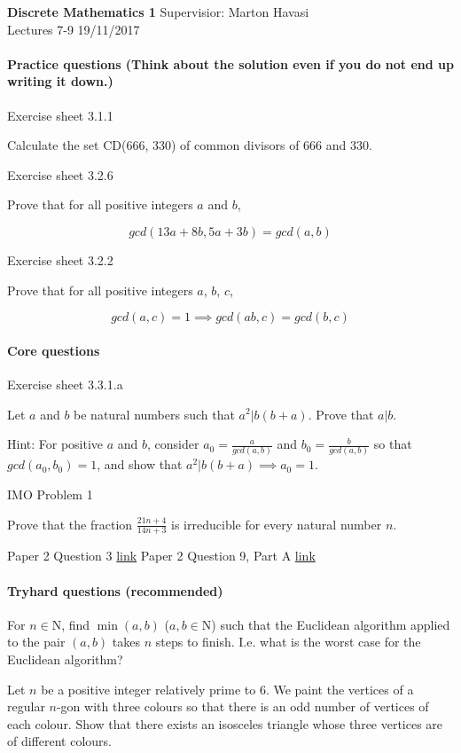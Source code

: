 \documentclass{exam}
\begin{document}
\noindent
\large\textbf{Discrete Mathematics 1} \hfill Supervisior: Marton Havasi \\
\normalsize Lectures 7-9 \hfill 19/11/2017

\paragraph{Practice questions (Think about the solution even if you do not end up writing it down.)}
\begin{questions}
\question Exercise sheet 3.1.1

Calculate the set CD(666, 330) of common divisors of 666 and 330.

\question Exercise sheet 3.2.6

Prove that for all positive integers $a$ and $b$,

$$gcd(13a + 8b , 5a + 3b)=gcd(a, b)$$ 

\question Exercise sheet 3.2.2

Prove that for all positive integers $a$, $b$, $c$,

$$gcd(a, c) = 1 \implies gcd(a  b, c) = gcd(b, c)$$
\end{questions}

\paragraph{Core questions}
\begin{questions}
 
\question Exercise sheet 3.3.1.a

 Let $a$ and $b$ be natural numbers such that $a^2 | b(b + a)$. Prove that $a | b$.
 
Hint: For positive $a$ and $b$, consider $a_0 =\frac{a}{gcd(a,b)}$ and $b_0 = \frac{b}{gcd(a,b)}$ so that $gcd(a_0, b_0) = 1$, and show
that $a^2| b(b + a) \implies a_0 = 1$.

 IMO Problem 1

Prove that the fraction $\frac{21n+4}{14n+3}$ is irreducible for every natural number $n$.

 Paper 2 Question 3 \href{http://www.cl.cam.ac.uk/teaching/exams/pastpapers/y2007p2q3.pdf}{link}
 Paper 2 Question 9, Part A \href{http://www.cl.cam.ac.uk/teaching/exams/pastpapers/y2015p2q9.pdf}{link}

\end{questions}

\paragraph{Tryhard questions (recommended)}
\begin{questions} 
\question  For $n \in \mathrm{N}$, find $\min (a,b)$ ($a, b \in \mathrm{N}$) such that the Euclidean algorithm applied to the pair $(a,b)$ takes $n$ steps to finish. I.e. what is the worst case for the Euclidean algorithm?
 
 \question Let $n$ be a positive integer relatively prime to 6. We paint the vertices of a regular $n$-gon with three colours so that there is an odd number of vertices of each colour. Show that there exists an isosceles triangle whose three vertices are of different colours.
\end{questions}
\end{document}

